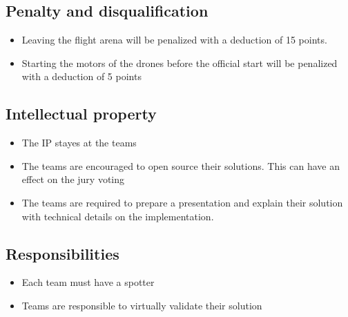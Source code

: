 \subsection{Penalty and disqualification}
\begin{itemize}
	\item Leaving the flight arena will be penalized with a deduction of 15 points.
	\item Starting the motors of the drones before the official start will be penalized with a deduction of 5 points
\end{itemize}

\subsection{Intellectual property}
\begin{itemize}
	\item{The IP stayes at the teams}
	\item{The teams are encouraged to open source their solutions. This can have an effect on the jury voting}
	\item{The teams are required to prepare a presentation and explain their solution with technical details on the implementation.}
\end{itemize}

\subsection{Responsibilities}
\begin{itemize}
	\item Each team must have a spotter
	\item Teams are responsible to virtually validate their solution
\end{itemize}
